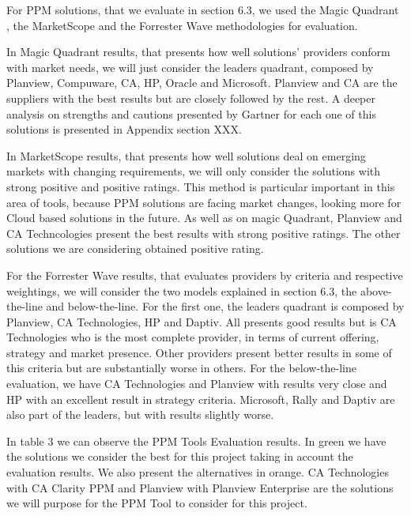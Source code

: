 For PPM solutions, that we evaluate in section 6.3, we used the Magic Quadrant , the MarketScope and the Forrester Wave methodologies for evaluation.\par
In Magic Quadrant results, that presents how well solutions' providers conform with market needs, we will just consider the leaders quadrant, composed by Planview, Compuware, CA, HP, Oracle and Microsoft. Planview and CA are the suppliers with the best results but are closely followed by the rest. A deeper analysis on strengths and cautions presented by Gartner for each one of this solutions is presented in Appendix section XXX.\par
In MarketScope results, that presents how well solutions deal on emerging markets with changing requirements, we will only consider the solutions with strong positive and positive ratings. This method is particular important in this area of tools, because PPM solutions are facing market changes, looking more for Cloud based solutions in the future. As well as on magic Quadrant, Planview and CA Techncologies present the best results with strong positive ratings. The other solutions we are considering obtained positive rating.\par
For the Forrester Wave results, that evaluates providers by criteria and respective weightings, we will consider the two models explained in section 6.3, the above-the-line and below-the-line. For the first one, the leaders quadrant is composed by Planview, CA Technologies, HP and Daptiv. All presents good results but is CA Technologies who is the most complete provider, in terms of current offering, strategy and market presence. Other providers present better results in some of this criteria but are substantially worse in others. For the below-the-line evaluation, we have CA Technologies and Planview with results very close and HP with an excellent result in strategy criteria. Microsoft, Rally and Daptiv are also part of the leaders, but with results slightly worse.\par
In table 3 we can observe the PPM Tools Evaluation results. In green we have the solutions we consider the best for this project taking in account the evaluation results. We also present the alternatives in orange. CA Technologies with CA Clarity PPM and Planview with Planview Enterprise are the solutions we will purpose for the PPM Tool to consider for this project.

